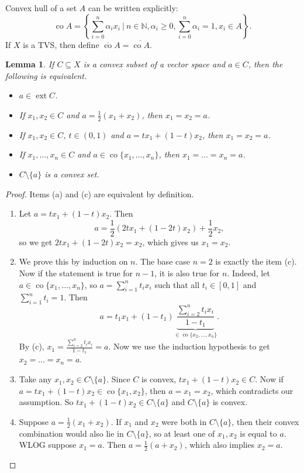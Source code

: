 \documentclass[10pt, a4paper]{article}
\newtheorem{lemma}[thm]{Lemma}
\newenvironment{noticeC}{%
  \tcolorbox[%
  notitle,
  empty,
  enhanced,  %
  breakable,
  coltext=black, 
  fontupper=\rmfamily,
  noparskip,
  sharp corners,
  boxrule=-1pt,  %
  frame hidden,
  left=7pt,  %
  right=7pt,
  top=5pt,
  bottom=5pt,
  before skip=2.5ex plus 2pt,
  after skip=2.5ex plus 2pt,
  overlay unbroken and last={%
  },
  ]}
{\endtcolorbox}
\newenvironment{myproof}%
  {\begin{noticeC}\begin{proof}}%
  {\end{proof}\end{noticeC}}
\newcommand{\N}{\mathbb {N}}
\DeclareMathOperator{\ext}{ext}
\DeclareMathOperator{\co}{co}
\begin{document}
Convex hull of a set $A$ can be written explicitly:
$$\co A = \left\lbrace \sum_{i = 0}^n \alpha_i x_i\ |\ n \in \N, \alpha_i \geq 0, \sum_{i = 0} ^n \alpha_i = 1, x_i \in A\right\rbrace.$$
If $X$ is a TVS, then define $\overline{\co} A = \overline{\co A}$.

\begin{lemma}
  If $C \subseteq X$ is a convex subset of a vector space and $a \in C$, then the following is equivalent.
  \begin{itemize}
    \item[(a)] $a \in \ext C$.
    \item[(b)] If $x_1, x_2 \in C$ and $a = \frac{1}{2} (x_1 + x_2)$, then $x_1 = x_2 = a$.
    \item[(c)] If $x_1, x_2 \in C$, $t \in (0, 1)$ and $a = t x_1 + (1 - t) x_2$, then $x_1 = x_2 = a$.
    \item[(d)] If $x_1, \dots, x_n \in C$ and $a \in \co \{x_1, \dots, x_n\}$, then $x_1 = \dots = x_n = a$.
    \item[(e)] $C \setminus \{a\}$ is a convex set.  
  \end{itemize}
\end{lemma}

\begin{myproof}
  Items (a) and (c) are equivalent by definition.
  \begin{enumerate}[itemindent=36pt]
    \item[(b) $\Rightarrow$ (c):] Let $a = tx_1 + (1 - t) x_2$. Then $$a = \frac{1}{2} (2t x_1 + (1 - 2t) x_2) + \frac{1}{2} x_2,$$
    so we get $2t x_1 + (1 - 2t) x_2 = x_2$, which gives us $x_1 = x_2$.
    \item[(c) $\Rightarrow$ (d):] We prove this by induction on $n$. The base case $n = 2$ is exactly the item (c).
    Now if the statement is true for $n-1$, it is also true for $n$. Indeed, let $a \in \co \{x_1, \dots, x_n\}$, so 
    $a = \sum_{i = 1} ^n t_i x_i $ such that all $t_i \in [0, 1]$ and $\sum_{i = 1} ^n t_i = 1$. Then 
    $$a = t_1 x_1 + (1 - t_1) \underbrace{\frac{\sum_{i = 2} ^n t_i x_i}{1 - t_1}}_{\in \co \{x_2, \dots, x_n\}}.$$
    By (c), $x_1 = \frac{\sum_{i = 2} ^n t_i x_i}{1 - t_1} = a$. Now we use the induction hypothesis to get $x_2 = \dots = x_n = a$.
    \item[(c) $\Rightarrow$ (d):] Take any $x_1, x_2 \in C \setminus \{a\}$. Since $C$ is convex, $t x_1 + (1 - t) x_2 \in C$.
    Now if $a = t x_1 + (1 - t) x_2 \in \co \{x_1, x_2\}$, then $a = x_1 = x_2$, which contradicts our assumption. So $t x_1 + (1 - t) x_2 \in C \setminus \{a\}$
    and $C \setminus \{a\}$ is convex.
    \item[(d) $\Rightarrow$ (b):] Suppose $a = \frac{1}{2} (x_1 + x_2)$. If $x_1$ and $x_2$ were both in $C \setminus \{a\}$,
    then their convex combination would also lie in $C \setminus \{a\}$, so at least one of $x_1, x_2$ is equal to $a$. WLOG suppose $x_1 = a$.
    Then $a = \frac{1}{2} (a + x_2)$, which also implies $x_2 = a$.
  \end{enumerate}
\end{myproof}
\end{document}
